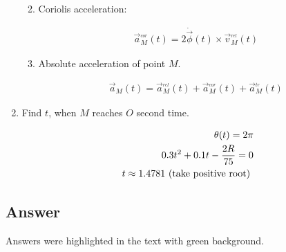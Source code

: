 \begin{enumerate}
\begin{enumerate}
\begin{answer}
                    \end{answer}
              \item Coriolis acceleration:
                    \begin{answer}
                        \begin{align}
                            \vec{a}^{_{cor}}_{M}(t) = 2 \dot{\vec{\phi}}(t) \times \vec{v}^{_{rel}}_{M}(t)
                        \end{align}
                    \end{answer}
              \item Absolute acceleration of point $M$.
                    \begin{answer}
                        \begin{align}
                            \vec{a}_M(t) = \vec{a}^{_{rel}}_{M}(t) + \vec{a}^{_{cor}}_{M}(t) + \vec{a}^{_{tr}}_M(t)
                        \end{align}
                    \end{answer}
          \end{enumerate}
    \item Find $t$, when $M$ reaches $O$ second time.
          \begin{answer}
              \begin{align}
                  \theta(t) = 2 \pi                   \notag \\
                  0.3 t^2 + 0.1 t - \frac{2R}{75} = 0        \\
                  t \approx 1.4781 \text{ (take positive root) } \notag
              \end{align}
          \end{answer}
\end{enumerate}

\subsection*{Answer}

Answers were highlighted in the text with green background.
